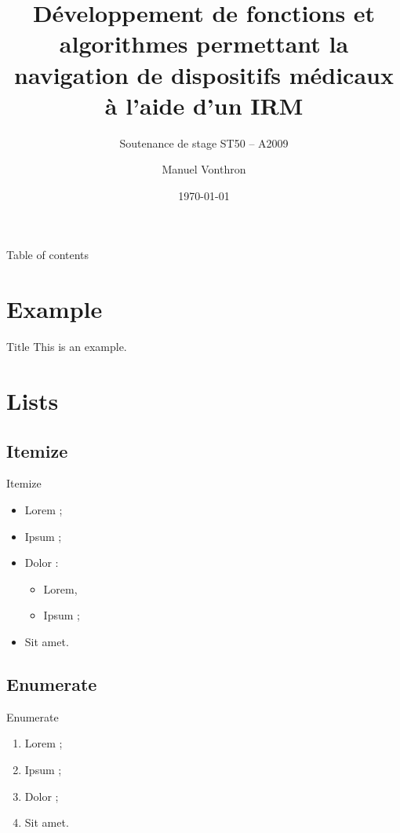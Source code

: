 \documentclass{beamer}
\begin{document}
\title[Plateforme de navigation par IRM]{D\'eveloppement de fonctions et 
  algorithmes permettant la navigation de dispositifs m\'edicaux \`a 
  l'aide d'un IRM}   
\subtitle{Soutenance de stage ST50 -- A2009}
\author{Manuel Vonthron} 
\date{\today} 


\begin{frame}[plain]
  \titlepage
\end{frame}


\begin{frame}{Table of contents}
  \tableofcontents
\end{frame}


\section{Example} 
\begin{frame}{Title} 
  This is an example.
\end{frame}


\section{Lists} 
\subsection{Itemize}

\begin{frame}{Itemize}
  \begin{itemize}
    \item Lorem ; \pause
    \item Ipsum ;
    \item Dolor : \pause
      \begin{itemize}
        \item Lorem,
        \item Ipsum ;
      \end{itemize}
    \item Sit amet.
  \end{itemize} 
\end{frame}


\subsection{Enumerate}
\begin{frame}{Enumerate}
  \begin{enumerate}
    \item Lorem ; \pause
    \item Ipsum ;
    \item Dolor ;
    \item Sit amet.
  \end{enumerate}
\end{frame}
\end{document}
